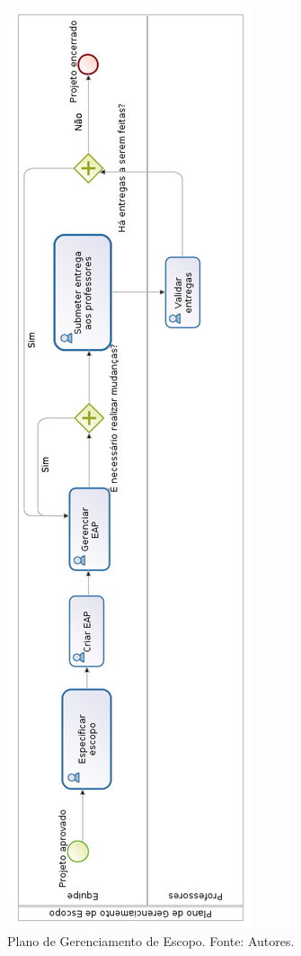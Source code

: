 \begin{figure}[htpb!]
    \centering
    \includegraphics[scale= 0.7]{figuras/escopo.png}
    \caption[Escopo]{Plano de Gerenciamento de Escopo. Fonte: Autores.}
    \label{fig:escopo}
\end{figure}

